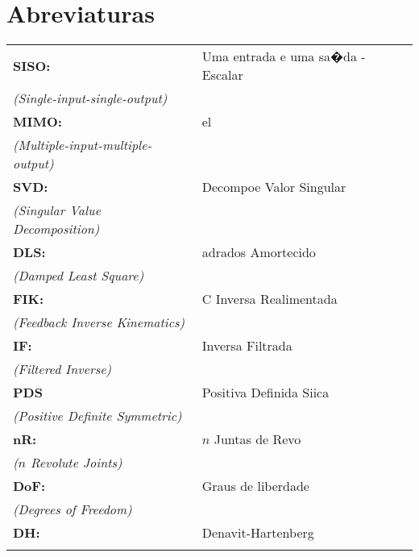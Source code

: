 \chapter*{Abreviaturas}
\noindent
{\small
\begin{tabular}{lp{12cm}}
{\bf{SISO:}} & \raggedright {Uma entrada e uma sa�da - Escalar} \\ {\emph{(Single-input-single-output)}}\tabularnewline
{\bf{MIMO:}} & \raggedright {el} \\ {\emph{(Multiple-input-multiple-output)}}\tabularnewline
{\bf{SVD:}} & \raggedright {Decompoe Valor Singular} \\ {\emph{(Singular Value Decomposition)}}\tabularnewline
{\bf{DLS:}} & \raggedright {adrados Amortecido} \\ {\emph{(Damped Least Square)}}\tabularnewline
{\bf{FIK:}} & \raggedright {C Inversa Realimentada} \\ {\emph{(Feedback Inverse Kinematics)}}\tabularnewline
{\bf{IF:}} & \raggedright {Inversa Filtrada} \\ {\emph{(Filtered Inverse)}}\tabularnewline
{\bf{PDS}} & \raggedright {Positiva Definida Siica} \\ {\emph{(Positive Definite Symmetric)}} \tabularnewline
{\bf{nR:}} & \raggedright {$n$ Juntas de Revo} \\ {\emph{($n$ Revolute Joints)}}\tabularnewline
{\bf{DoF:}} & \raggedright {Graus de liberdade} \\ {\emph{(Degrees of Freedom)}}\tabularnewline
{\bf{DH:}} & \raggedright {Denavit-Hartenberg} \\ \tabularnewline
\end{tabular}
}
\mainmatter
